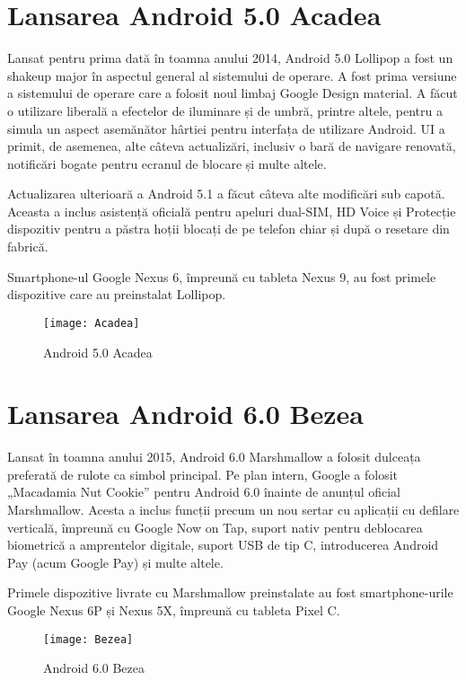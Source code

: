 \documentclass[a4paper,12pt]{amsbook}
\begin{document}
\chapter{\Large Lansarea Android 5.0 Acadea}
\par
Lansat pentru prima dată în toamna anului 2014, Android 5.0 Lollipop a fost un shakeup major în aspectul general al sistemului de operare. A fost prima versiune a sistemului de operare care a folosit noul limbaj Google Design material. A făcut o utilizare liberală a efectelor de iluminare și de umbră, printre altele, pentru a simula un aspect asemănător hârtiei pentru interfața de utilizare Android. UI a primit, de asemenea, alte câteva actualizări, inclusiv o bară de navigare renovată, notificări bogate pentru ecranul de blocare și multe altele.

Actualizarea ulterioară a Android 5.1 a făcut câteva alte modificări sub capotă. Aceasta a inclus asistență oficială pentru apeluri dual-SIM, HD Voice și Protecție dispozitiv pentru a păstra hoții blocați de pe telefon chiar și după o resetare din fabrică.

Smartphone-ul Google Nexus 6, împreună cu tableta Nexus 9, au fost primele dispozitive care au preinstalat Lollipop.
\begin{figure}[h]
	\centering
	\texttt{[image: Acadea]}
	\caption[Acadea]{Android 5.0 Acadea}
	\label{fig:acadea}
\end{figure}
\par
\chapter{\Large Lansarea Android 6.0 Bezea}
\par
Lansat în toamna anului 2015, Android 6.0 Marshmallow a folosit dulceața preferată de rulote ca simbol principal. Pe plan intern, Google a folosit „Macadamia Nut Cookie” pentru Android 6.0 înainte de anunțul oficial Marshmallow. Acesta a inclus funcții precum un nou sertar cu aplicații cu defilare verticală, împreună cu Google Now on Tap, suport nativ pentru deblocarea biometrică a amprentelor digitale, suport USB de tip C, introducerea Android Pay (acum Google Pay) și multe altele.

Primele dispozitive livrate cu Marshmallow preinstalate au fost smartphone-urile Google Nexus 6P și Nexus 5X, împreună cu tableta Pixel C.
\begin{figure}[h]
	\centering
	\texttt{[image: Bezea]}
	\caption[Bezea]{Android 6.0 Bezea}
	\label{fig:bezea}
\end{figure}
\par
\end{document}
